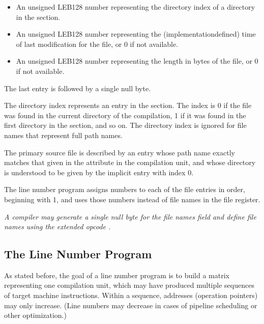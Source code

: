\begin{enumerate}[1. ]
\begin{itemize}
\item An unsigned LEB128 
number representing the directory
index of a directory in the 
 section.


\item An unsigned LEB128
number representing the
(implementation\dash defined) time of last modification for
the file, or 0 if not available.

\item An unsigned LEB128 
number representing the length in
bytes of the file, or 0 if not available.  

\end{itemize}

The last entry is followed by a single null byte.

The directory index represents an entry in the
 section. 
The index is 0 if the file was
found in the current directory of the compilation, 1 if it
was found in the first directory in the 
section, and so on. The directory index is ignored for file
names that represent full path names.

The primary source file is described by an entry whose path
name exactly matches that given in the  attribute
in the compilation unit, and whose directory is understood
to be given by the implicit entry with index 0.

The line number program assigns numbers to each of the file
entries in order, beginning with 1, and uses those numbers
instead of file names in the file register.

\textit{A compiler may generate a single null byte for the file
names field and define file names using the extended opcode
.}


\end{enumerate}

\subsection{The Line Number Program}

As stated before, the goal of a line number program is to build
a matrix representing one compilation unit, which may have
produced multiple sequences of target machine instructions.
Within a sequence, addresses 
(operation pointers) may only
increase. (Line numbers may decrease in cases of pipeline
scheduling or other optimization.)

